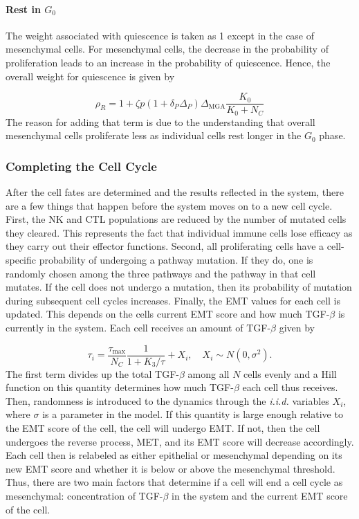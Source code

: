 \documentclass[11pt]{article}
\begin{document}
\paragraph{Rest in $G_0$} 
The weight associated with quiescence is taken as 1 except in the case of mesenchymal cells.
For mesenchymal cells, the decrease in the probability of proliferation leads to an increase in the probability of quiescence.
Hence, the overall weight for quiescence is given by

\begin{equation}\tag{2.4}
\rho_R = 1 + \zeta p(1+\delta_P\Delta_P)\Delta_{\text{MGA}}\frac{K_0}{K_0+N_C}
\end{equation}
The reason for adding that term is due to the understanding that overall mesenchymal cells proliferate less as individual cells rest longer in the $G_0$ phase.

\subsubsection{Completing the Cell Cycle}
After the cell fates are determined and the results reflected in the system, there are a few things that happen before the system moves on to a new cell cycle.
First, the NK and CTL populations are reduced by the number of mutated cells they cleared.
This represents the fact that individual immune cells lose efficacy as they carry out their effector functions. 
Second, all proliferating cells have a cell-specific probability of undergoing a pathway mutation.
If they do, one is randomly chosen among the three pathways and the pathway in that cell mutates.
If the cell does not undergo a mutation, then its probability of mutation during subsequent cell cycles increases. 
Finally, the EMT values for each cell is updated.
This depends on the cells current EMT score and how much TGF-$\beta$ is currently in the system.
Each cell receives an amount of TGF-$\beta$ given by

\begin{equation}\tag{2.5}
\tau_i = \frac{\tau_{\text{max}}}{N_C}\frac{1}{1+K_3/\tau}+ X_i
, \quad X_i \sim N(0,\sigma^2).
\end{equation}
The first term divides up the total TGF-$\beta$ among all $N$ cells evenly and a Hill function on this quantity determines how much TGF-$\beta$ each cell thus receives.
Then, randomness is introduced to the dynamics through the {\em i.i.d.} variables $X_i$, where $\sigma$ is a parameter in the model.
If this quantity is large enough relative to the EMT score of the cell, the cell will undergo EMT.
If not, then the cell undergoes the reverse process, MET, and its EMT score will decrease accordingly.
Each cell then is relabeled as either epithelial or mesenchymal depending on its new EMT score and whether it is below or above the mesenchymal threshold.
Thus, there are two main factors that determine if a cell will end a cell cycle as mesenchymal: concentration of TGF-$\beta$ in the system and the current EMT score of the cell.
\end{document}
